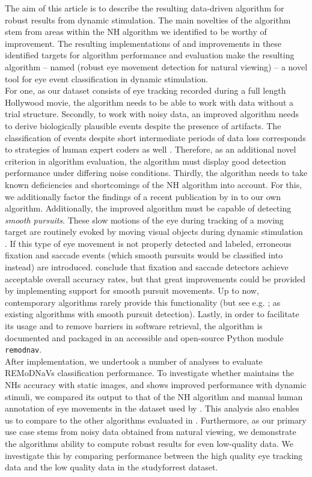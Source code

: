 The aim of this article is to describe the resulting data-driven algorithm for robust results from dynamic
stimulation. The main novelties of the algorithm stem from areas within the NH algorithm we identified to be
worthy of improvement. The resulting implementations of and improvements in these identified targets for algorithm
performance and evaluation make the resulting algorithm -- named \remodnav (robust eye movement detection for
natural
viewing) -- a novel tool for eye event classification in dynamic stimulation.\\
For one, as our dataset consists of eye tracking recorded during a full length Hollywood movie, the algorithm
needs to be able to work with data without a trial structure.  Secondly, to work with noisy data, an improved
algorithm needs to derive biologically plausible events despite the presence of artifacts. The classification of
events despite short intermediate periods of data loss corresponds to strategies of human expert coders as
well \citep{Hooge2018}. Therefore, as an additional novel criterion in algorithm evaluation, the algorithm must
display good detection performance under differing noise conditions. Thirdly, the algorithm needs to take known
deficiencies and shortcomings of the NH algorithm into account. For this, we additionally factor the findings of
a recent publication by \cite{Friedman2018} in to our own algorithm.
Additionally, the improved algorithm must be capable of detecting \textit{smooth pursuits}. These slow motions of
the eye during tracking of a moving target are routinely evoked by moving visual objects during dynamic stimulation
\citep{carl1987pursuits}. If this type of eye movement is not properly detected and labeled, erroneous fixation and
saccade events (which smooth pursuits would be classified into instead) are introduced. \cite{Andersson2017}
conclude that fixation and saccade detectors achieve acceptable overall accuracy rates, but that great improvements
could be provided by implementing support for smooth pursuit movements. Up to now, contemporary algorithms rarely
provide this functionality (but see e.g. \cite{LARSSON2015145}; \cite{Komogortsev2013} as existing algorithms with
smooth pursuit detection).  Lastly, in order to facilitate its usage and to remove barriers in software
retrieval, the \remodnav algorithm is documented and packaged in an accessible and open-source Python module
\texttt{remodnav}. \\

After implementation, we undertook a number of analyses to evaluate REMoDNaVs classification performance. To
investigate whether \remodnav maintains the NHs accuracy with static images, and shows improved performance with
dynamic stimuli, we compared its output to that of the NH algorithm and manual human annotation of eye movements
in the dataset used by \cite{Andersson2017}. This analysis also enables us to compare \remodnav to the other
algorithms evaluated in \citet{Andersson2017}. Furthermore, as our primary use case stems from noisy data obtained
from natural viewing, we demonstrate the algorithms ability to compute robust results for even low-quality data.
We investigate this by comparing performance between the high quality eye tracking data and the low quality data
in the studyforrest dataset.


